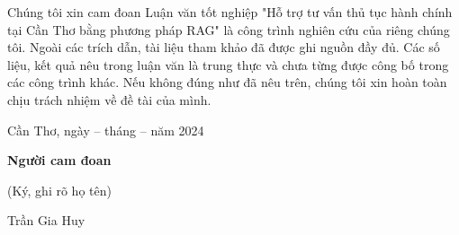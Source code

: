 Chúng tôi xin cam đoan Luận văn tốt nghiệp "Hỗ trợ tư vấn thủ tục hành chính tại Cần Thơ bằng phương pháp RAG" \space là công trình nghiên cứu của riêng chúng tôi.
Ngoài các trích dẫn, tài liệu tham khảo đã được ghi nguồn đầy đủ.
Các số liệu, kết quả nêu trong luận văn là trung thực và chưa từng được công bố trong các công trình khác.
Nếu không đúng như đã nêu trên, chúng tôi xin hoàn toàn chịu trách nhiệm về đề tài của mình.

\begin{multicols}{2}
    \begin{minipage}{\linewidth}
    \end{minipage}

    \begin{minipage}{\linewidth}
        \centering
        Cần Thơ, ngày -- tháng -- năm 2024 %

        \textbf{Người cam đoan}

        (Ký, ghi rõ họ tên) \\

        \vspace{2.5cm}

        Trần Gia Huy
    \end{minipage}
\end{multicols}